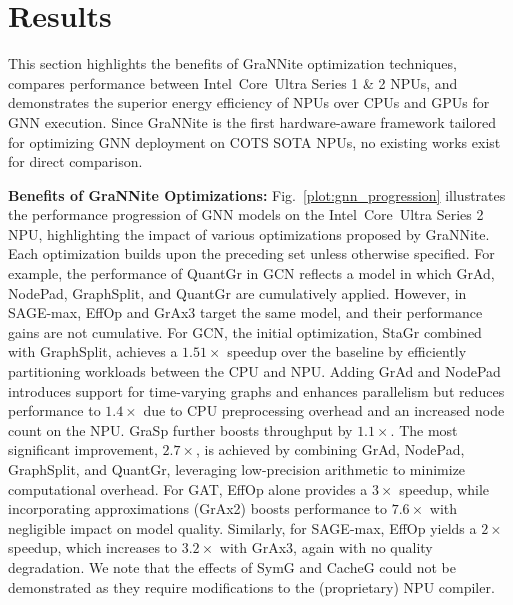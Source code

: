 \section{Results}\label{sec:results}
This section highlights the benefits of GraNNite optimization techniques, compares performance between Intel\textregistered\ Core\texttrademark\ Ultra Series 1 \& 2 NPUs, and demonstrates the superior energy efficiency of NPUs over CPUs and GPUs for GNN execution.
Since GraNNite is the first hardware-aware framework tailored for optimizing GNN deployment on COTS SOTA NPUs, no existing works exist for direct comparison.

\textbf{Benefits of GraNNite Optimizations:} Fig.~\ref{plot:gnn_progression} illustrates the performance progression of GNN models on the Intel\textregistered\ Core\texttrademark\ Ultra Series 2 NPU, highlighting the impact of various optimizations proposed by GraNNite. Each optimization builds upon the preceding set unless otherwise specified. For example, the performance of QuantGr in GCN reflects a model in which GrAd, NodePad, GraphSplit, and QuantGr are cumulatively applied. However, in SAGE-max, EffOp and GrAx3 target the same model, and their performance gains are not cumulative.
For GCN, the initial optimization, StaGr combined with GraphSplit, achieves a $1.51\times$ speedup over the baseline by efficiently partitioning workloads between the CPU and NPU. Adding GrAd and NodePad introduces support for time-varying graphs and enhances parallelism but reduces performance to $1.4\times$ due to CPU preprocessing overhead and an increased node count on the NPU. GraSp further boosts throughput by $1.1\times$. The most significant improvement, $2.7\times$, is achieved by combining GrAd, NodePad, GraphSplit, and QuantGr, leveraging low-precision arithmetic to minimize computational overhead.
For GAT, EffOp alone provides a $3\times$ speedup, while incorporating approximations (GrAx2) boosts performance to $7.6\times$ with negligible impact on model quality. Similarly, for SAGE-max, EffOp yields a $2\times$ speedup, which increases to $3.2\times$ with GrAx3, again with no quality degradation.
We note that the effects of SymG and CacheG could not be demonstrated as they require modifications to the (proprietary) NPU compiler.

